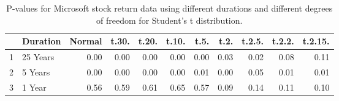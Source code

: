 \begin{table}[ht]
\centering
\begin{tabular}{rlrrrrrrrrr}
  \hline
 & Duration & Normal & t.30. & t.20. & t.10. & t.5. & t.2. & t.2.5. & t.2.2. & t.2.15. \\ 
  \hline
1 & 25 Years & 0.00 & 0.00 & 0.00 & 0.00 & 0.00 & 0.03 & 0.02 & 0.08 & 0.11 \\ 
  2 & 5 Years & 0.00 & 0.00 & 0.00 & 0.00 & 0.01 & 0.00 & 0.05 & 0.01 & 0.01 \\ 
  3 & 1 Year & 0.56 & 0.59 & 0.61 & 0.65 & 0.57 & 0.09 & 0.14 & 0.11 & 0.10 \\ 
   \hline
\end{tabular}
\caption{P-values for Microsoft stock return data using different durations
  and different degrees of freedom for Student's t distribution.} 
\end{table}

